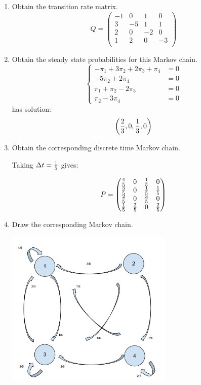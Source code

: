 \documentclass[12pt]{article}
\begin{document}
\begin{enumerate}
\begin{enumerate}
	\item Obtain the transition rate matrix.
$$Q=\begin{pmatrix}
-1&0&1&0\\
3&-5&1&1\\
2&0&-2&0\\
1&2&0&-3\\
\end{pmatrix}$$

	\item Obtain the steady state probabilities for this Markov chain.
$$
\begin{cases}
-\pi_1+3\pi_2+2\pi_3+\pi_4&=0\\
-5\pi_2+2\pi_4&=0\\
\pi_1+\pi_2-2\pi_3&=0\\
\pi_2-3\pi_4&=0
\end{cases}
$$
has solution:
$$\left({2\over3},0,{1\over3},0\right)$$

	\item Obtain the corresponding discrete time Markov chain.

Taking $\Delta t={1\over 5}$ gives:

$$P=\begin{pmatrix}
{4\over5}&0&{1\over5}&0\\
{3\over5}&0&{1\over5}&{1\over5}\\
{2\over 5}&0&{3\over5}&0\\
{1\over 5}&{2\over5}&0&{2\over 5}\\
\end{pmatrix}$$


	\item Draw the corresponding Markov chain.

\begin{center}
\includegraphics[width=8cm]{Markov_Chains_Ex_5-d.pdf}
\end{center}


\end{enumerate}
\end{enumerate}
\end{document}
